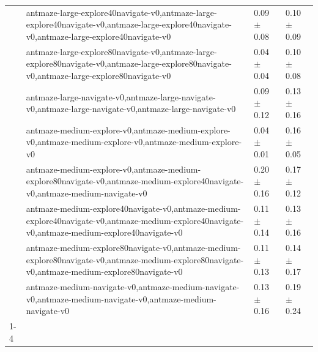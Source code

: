 \begin{tabular}{llll}
 & antmaze-large-explore40navigate-v0,antmaze-large-explore40navigate-v0,antmaze-large-explore40navigate-v0,antmaze-large-explore40navigate-v0 & 0.09 $\pm$ 0.08 & 0.10 $\pm$ 0.09 \\
 & antmaze-large-explore80navigate-v0,antmaze-large-explore80navigate-v0,antmaze-large-explore80navigate-v0,antmaze-large-explore80navigate-v0 & 0.04 $\pm$ 0.04 & 0.10 $\pm$ 0.08 \\
 & antmaze-large-navigate-v0,antmaze-large-navigate-v0,antmaze-large-navigate-v0,antmaze-large-navigate-v0 & 0.09 $\pm$ 0.12 & 0.13 $\pm$ 0.16 \\
 & antmaze-medium-explore-v0,antmaze-medium-explore-v0,antmaze-medium-explore-v0,antmaze-medium-explore-v0 & 0.04 $\pm$ 0.01 & 0.16 $\pm$ 0.05 \\
 & antmaze-medium-explore-v0,antmaze-medium-explore80navigate-v0,antmaze-medium-explore40navigate-v0,antmaze-medium-navigate-v0 & 0.20 $\pm$ 0.16 & 0.17 $\pm$ 0.12 \\
 & antmaze-medium-explore40navigate-v0,antmaze-medium-explore40navigate-v0,antmaze-medium-explore40navigate-v0,antmaze-medium-explore40navigate-v0 & 0.11 $\pm$ 0.14 & 0.13 $\pm$ 0.16 \\
 & antmaze-medium-explore80navigate-v0,antmaze-medium-explore80navigate-v0,antmaze-medium-explore80navigate-v0,antmaze-medium-explore80navigate-v0 & 0.11 $\pm$ 0.13 & 0.14 $\pm$ 0.17 \\
 & antmaze-medium-navigate-v0,antmaze-medium-navigate-v0,antmaze-medium-navigate-v0,antmaze-medium-navigate-v0 & 0.13 $\pm$ 0.16 & 0.19 $\pm$ 0.24 \\
\cline{1-4}
\bottomrule
\end{tabular}
